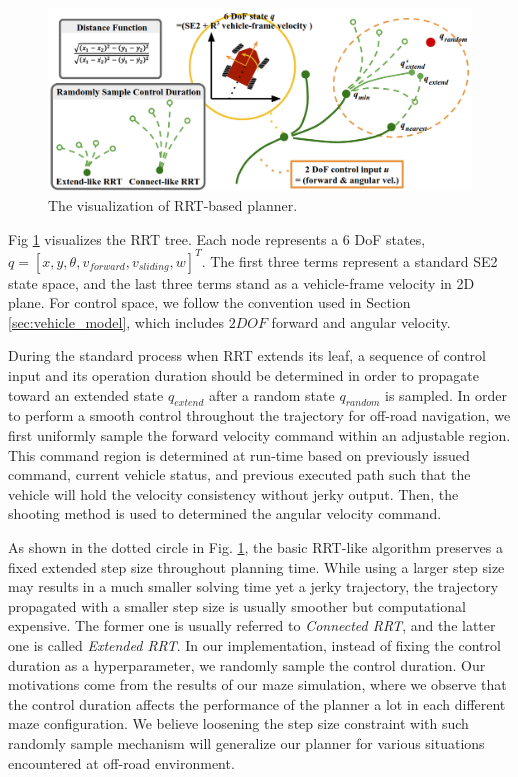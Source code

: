 \documentclass[../thesis.tex]{subfiles}
\begin{document}
\begin{figure}[t]
	\begin{center}
		\centerline{\includegraphics[width=0.8\columnwidth]{./RRTPlanner/fig/rrt.png}}
		\caption{The visualization of RRT-based planner.}
		\label{fig:rrt}
	\end{center}
\end{figure} 

Fig \ref{fig:rrt} visualizes the RRT tree. Each node represents a $6$ DoF states, $q=[x,y, \theta ,v_{forward}, v_{sliding}, w]^T$. The first three terms represent a standard SE2 state space, and the last three terms stand as a vehicle-frame velocity in 2D plane. For control space, we follow the convention used in Section \ref{sec:vehicle_model}, which includes $2DOF$ forward and angular velocity.

During the standard process when RRT extends its leaf, a sequence of control input and its operation duration should be determined in order to propagate toward an extended state $q_{extend}$ after a random state $q_{random}$ is sampled. 
In order to perform a smooth control throughout the trajectory for off-road navigation, we first uniformly sample the forward velocity command within an adjustable region. 
This command region is determined at run-time based on previously issued command, current vehicle status, and previous executed path such that the vehicle will hold the velocity consistency without jerky output. 
Then, the shooting method is used to determined the angular velocity command.

As shown in the dotted circle in Fig. \ref{fig:rrt}, the basic RRT-like algorithm preserves a fixed extended step size throughout planning time. 
While using a larger step size may results in a much smaller solving time yet a jerky trajectory, the trajectory propagated with a smaller step size is usually smoother but computational expensive. 
The former one is usually referred to \textit{Connected RRT}, and the latter one is called \textit{Extended RRT}. 
In our implementation, instead of fixing the control duration as a hyperparameter, we randomly sample the control duration. 
Our motivations come from the results of our maze simulation, where we observe that the control duration affects the performance of the planner a lot in each different maze configuration. 
We believe loosening the step size constraint with such randomly sample mechanism will generalize our planner for various situations encountered at off-road environment. 
\end{document}
